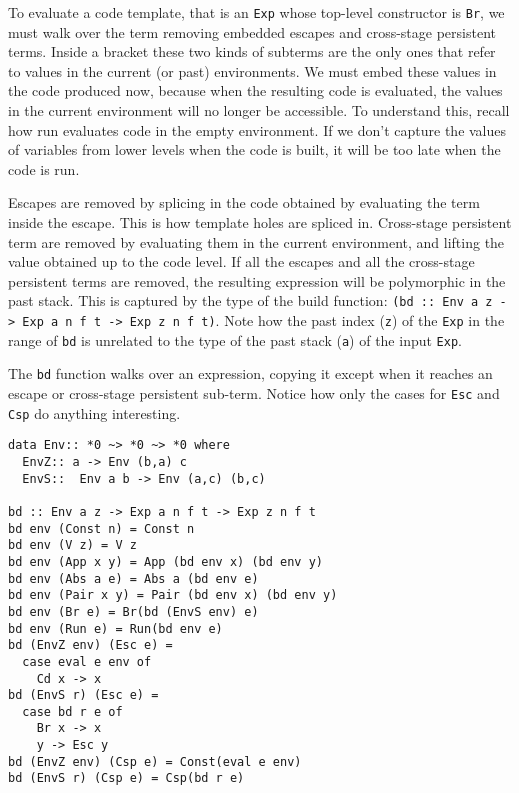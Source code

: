 \documentclass{sigplanconf}
\begin{document}
To evaluate a code template, that is an {\tt Exp} whose top-level constructor
is {\tt Br}, we must walk over the term removing embedded escapes and 
cross-stage persistent terms. Inside a bracket these two kinds of subterms 
are the only ones that refer to values in the current (or past) environments. We must embed these
values in the code produced now, because when the resulting code is evaluated,
the values in the current environment will no longer be accessible.
To understand this, recall how run evaluates code in the empty environment.
If we don't capture the values of variables from lower levels when the
code is built, it will be too late when the code is run.

Escapes are removed by splicing in the code obtained
by evaluating the term inside the escape. This is how template
holes are spliced in. Cross-stage persistent
term are removed by evaluating them in the current environment,
and lifting the value obtained up to the code level. If all the escapes
and all the cross-stage persistent terms are removed, the resulting
expression will be polymorphic in the past stack. This is captured by the 
type of the
build function: \verb+(bd :: Env a z -> Exp a n f t -> Exp z n f t)+.
Note how the past index ({\tt z}) of the {\tt Exp} in the range of {\tt bd}
is unrelated to the type of the past stack ({\tt a}) of the input {\tt Exp}.

The {\tt bd} function walks over an expression, copying it except
when it reaches an escape or cross-stage persistent sub-term. Notice
how only the cases for {\tt Esc} and {\tt Csp} do anything interesting.

\begin{verbatim}
data Env:: *0 ~> *0 ~> *0 where
  EnvZ:: a -> Env (b,a) c
  EnvS::  Env a b -> Env (a,c) (b,c)   
  
bd :: Env a z -> Exp a n f t -> Exp z n f t
bd env (Const n) = Const n 
bd env (V z) = V z
bd env (App x y) = App (bd env x) (bd env y)
bd env (Abs a e) = Abs a (bd env e)
bd env (Pair x y) = Pair (bd env x) (bd env y)
bd env (Br e) = Br(bd (EnvS env) e)
bd env (Run e) = Run(bd env e)
bd (EnvZ env) (Esc e) = 
  case eval e env of 
    Cd x -> x
bd (EnvS r) (Esc e) = 
  case bd r e of 
    Br x -> x
    y -> Esc y 
bd (EnvZ env) (Csp e) = Const(eval e env)
bd (EnvS r) (Csp e) = Csp(bd r e)  
\end{verbatim}
\end{document}
